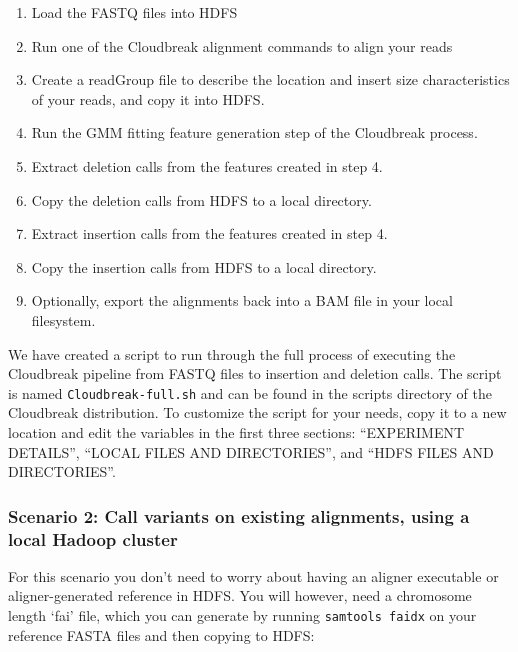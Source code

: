 \documentclass[11pt]{article}
\begin{document}
\begin{enumerate}
\item Load the FASTQ files into HDFS

\item Run one of the Cloudbreak alignment commands to align your reads

\item Create a readGroup file to describe the location and insert size characteristics of your reads, and copy it into HDFS.

\item Run the GMM fitting feature generation step of the Cloudbreak process.

\item Extract deletion calls from the features created in step 4.

\item Copy the deletion calls from HDFS to a local directory.

\item Extract insertion calls from the features created in step 4.

\item Copy the insertion calls from HDFS to a local directory.

\item Optionally, export the alignments back into a BAM file in your local filesystem.

\end{enumerate}

We have created a script to run through the full process of executing the
Cloudbreak pipeline from FASTQ files to insertion and deletion calls. The
script is named \texttt{Cloudbreak-full.sh} and can be found in the scripts directory
of the Cloudbreak distribution. To customize the script for your needs, copy
it to a new location and edit the variables in the first three sections:
``EXPERIMENT DETAILS'', ``LOCAL FILES AND DIRECTORIES'', and
``HDFS FILES AND DIRECTORIES''.

\subsubsection{Scenario 2: Call variants on existing alignments, using a local Hadoop cluster}
\label{scenario2:callvariantsonexistingalignmentsusingalocalhadoopcluster}

For this scenario you don't need to worry about having an aligner executable or
aligner-generated reference in HDFS. You will however, need a chromosome length
`fai' file, which you can generate by running \texttt{samtools faidx} on your reference
FASTA files and then copying to HDFS:
\end{document}
